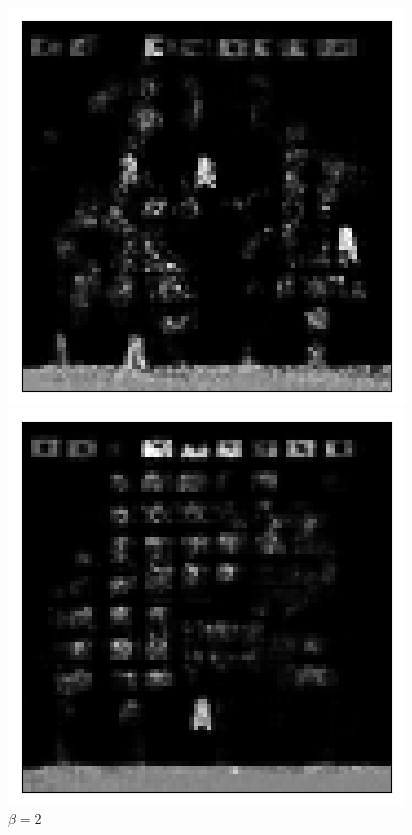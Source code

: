 \begin{figure}[h!]
\centering
\captionsetup{justification=centering}
\begin{multicols}{3}
    \includegraphics[scale=0.4]{figures/results/indiscriminate_decoupling/beta_1_prior_sample_2.png}
    \caption{$\beta=1$}
    \includegraphics[scale=0.4]{figures/results/indiscriminate_decoupling/beta_2_prior_sample_0.png}
    \caption{$\beta=2$}

\end{multicols}
\end{figure}
